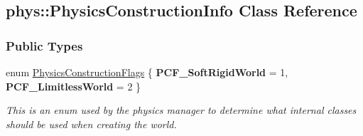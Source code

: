 \hypertarget{classphys_1_1PhysicsConstructionInfo}{
\subsection{phys::PhysicsConstructionInfo Class Reference}
\label{classphys_1_1PhysicsConstructionInfo}
}
\subsubsection*{Public Types}
\begin{DoxyCompactItemize}
\item 
enum \hyperlink{classphys_1_1PhysicsConstructionInfo_af37c7fea33a2150f0a199e9e208b2d67}{PhysicsConstructionFlags} \{ {\bfseries PCF\_\-SoftRigidWorld} =  1, 
{\bfseries PCF\_\-LimitlessWorld} =  2
 \}
\begin{DoxyCompactList}\small\item\em This is an enum used by the physics manager to determine what internal classes should be used when creating the world. \item\end{DoxyCompactList}\end{DoxyCompactItemize}
